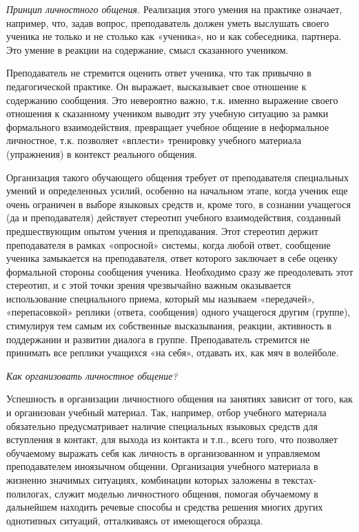 \textit{Принцип личностного общения.}
Реализация этого умения на практике означает, например, что, задав вопрос, преподаватель должен уметь выслушать своего ученика не только и не столько как «ученика», но и как собеседника, партнера. Это умение  в реакции на содержание, смысл сказанного учеником.

Преподаватель не стремится оценить ответ ученика, что так привычно в педагогической практике. Он выражает, высказывает свое отношение к содержанию сообщения. Это невероятно важно, т.к. именно выражение своего отношения к сказанному учеником выводит эту учебную ситуацию за рамки формального взаимодействия, превращает учебное общение в неформальное личностное, т.к. позволяет «вплести» тренировку учебного материала (упражнения) в контекст реального общения.

Организация такого обучающего общения требует от преподавателя специальных умений и определенных усилий, особенно на начальном этапе, когда ученик еще очень ограничен в выборе языковых средств и, кроме того, в сознании учащегося (да и преподавателя) действует стереотип учебного взаимодействия, созданный предшествующим опытом учения и преподавания. Этот стереотип держит преподавателя в рамках «опросной» системы, когда любой ответ, сообщение ученика замыкается на преподавателя, ответ которого заключает в себе оценку формальной стороны сообщения ученика. Необходимо сразу же преодолевать этот стереотип, и с этой точки зрения чрезвычайно важным оказывается использование специального приема, который мы называем «передачей», «перепасовкой» реплики (ответа, сообщения) одного учащегося другим (группе), стимулируя тем самым их собственные высказывания, реакции, активность в поддержании и развитии диалога в группе. Преподаватель  стремится не принимать все реплики учащихся «на себя», отдавать их, как мяч в волейболе.

\textit{Как организовать личностное общение?}

Успешность в организации личностного общения на занятиях зависит от того, как  и организован учебный материал. Так, например, отбор учебного материала обязательно предусматривает наличие специальных языковых средств для вступления в контакт, для выхода из контакта и т.п., всего того, что позволяет обучаемому выражать себя как личность в организованном и управляемом преподавателем иноязычном общении. Организация учебного материала в жизненно значимых ситуациях, комбинации которых заложены в текстах-полилогах, служит моделью личностного общения, помогая обучаемому в дальнейшем находить речевые способы и средства решения многих других однотипных ситуаций, отталкиваясь от имеющегося образца.


